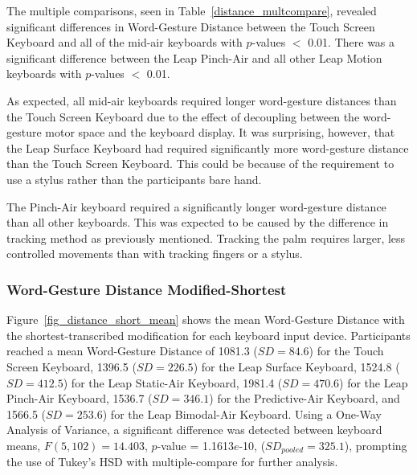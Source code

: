 The multiple comparisons, seen in Table~\ref{distance_multcompare}, revealed significant differences in Word-Gesture Distance between the Touch Screen Keyboard and all of the mid-air keyboards with $p$-values $<$ 0.01. There was a significant difference between the Leap Pinch-Air and all other Leap Motion keyboards with $p$-values $<$ 0.01.

As expected, all mid-air keyboards required longer word-gesture distances than the Touch Screen Keyboard due to the effect of decoupling between the word-gesture motor space and the keyboard display. It was surprising, however, that the Leap Surface Keyboard had required significantly more word-gesture distance than the Touch Screen Keyboard. This could be because of the requirement to use a stylus rather than the participants bare hand.

The Pinch-Air keyboard required a significantly longer word-gesture distance than all other keyboards. This was expected to be caused by the difference in tracking method as previously mentioned. Tracking the palm requires larger, less controlled movements than with tracking fingers or a stylus.

\subsubsection{Word-Gesture Distance Modified-Shortest}
Figure~\ref{fig_distance_short_mean} shows the mean Word-Gesture Distance with the shortest-transcribed modification for each keyboard input device. Participants reached a mean Word-Gesture Distance of 1081.3 ($SD = 84.6$) for the Touch Screen Keyboard, 1396.5 ($SD = 226.5$) for the Leap Surface Keyboard, 1524.8 ($SD = 412.5$) for the Leap Static-Air Keyboard, 1981.4 ($SD = 470.6$) for the Leap Pinch-Air Keyboard, 1536.7 ($SD = 346.1$) for the Predictive-Air Keyboard, and 1566.5 ($SD = 253.6$) for the Leap Bimodal-Air Keyboard. Using a One-Way Analysis of Variance, a significant difference was detected between keyboard means, $F(5, 102) = 14.403$, $p$-value = 1.1613$e$-10, ($SD_{pooled} = 325.1$), prompting the use of Tukey's HSD with multiple-compare for further analysis.

